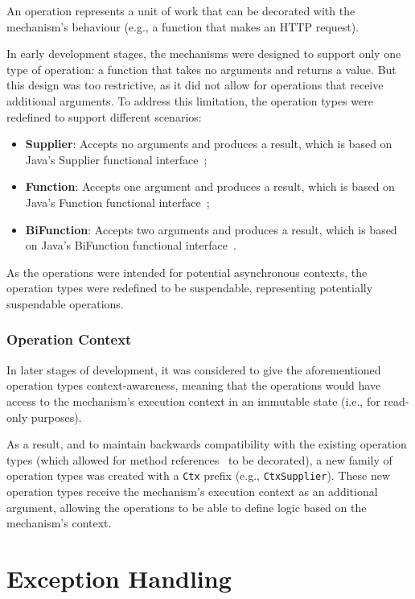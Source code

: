 An operation represents a unit of work that can be decorated with the mechanism's behaviour (e.g., a function that makes an HTTP request).

In early development stages, the mechanisms were designed to support only one type of operation:
a function that takes no arguments and returns a value.
But this design was too restrictive, as it did not allow for operations that receive additional arguments.
To address this limitation, the operation types were redefined to support different scenarios:

\begin{itemize}
    \item \textbf{Supplier}: Accepts no arguments and produces a result, which is based on Java's Supplier functional interface~\cite{java-supplier};
    \item \textbf{Function}: Accepts one argument and produces a result, which is based on Java's Function functional interface~\cite{java-function};
    \item \textbf{BiFunction}: Accepts two arguments and produces a result, which is based on Java's BiFunction functional interface~\cite{java-bifunction}.
\end{itemize}

As the operations were intended for potential asynchronous contexts, the operation types were redefined to be suspendable, representing potentially suspendable operations.

\subsubsection{Operation Context}\label{subsubsec:operation-context}

In later stages of development, it was considered to give the aforementioned operation types context-awareness,
meaning that the operations would have access to the mechanism's execution context in an immutable state
(i.e., for read-only purposes).

As a result, and to maintain backwards compatibility with the existing operation types (which allowed for method references~\cite{java-method-references} to be decorated), a new family of operation types was created with a \texttt{Ctx} prefix (e.g., \texttt{CtxSupplier}).
These new operation types receive the mechanism's execution context as an additional argument,
allowing the operations to be able to define logic based on the mechanism's context.


\section{Exception Handling}\label{sec:exception-handling}

